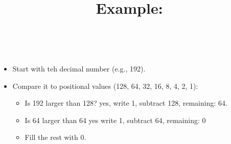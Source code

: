 \documentclass[a4paper,11pt]{article}
\begin{document}
\title{Example:}\\
\begin{itemize}
    \item Start with teh decimal number (e.g., 192).\\
    \item Compare it to positional values (128, 64, 32, 16, 8, 4, 2, 1):\\
    \begin{itemize}
        \item Is 192 larger than 128? yes, write 1, subtract 128, remaining: 64.\\
        \item Is 64 larger than 64 yes write 1, subtract 64, remaining: 0\\
        \item Fill the rest with 0.\\
    \end{itemize}
\end{itemize}
\end{document}

